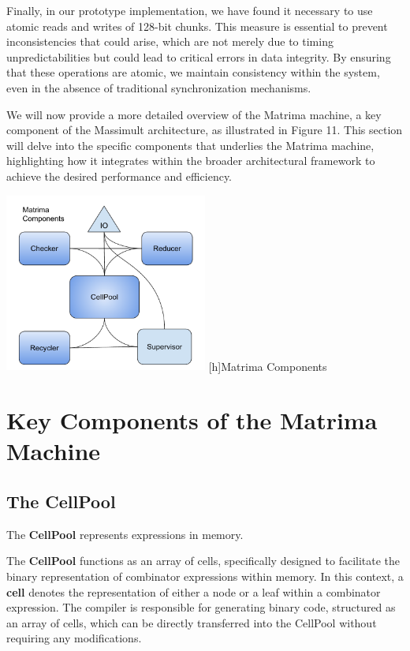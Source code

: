\documentclass{IEEEtran}
\begin{document}
\par Finally, in our prototype implementation, we have found it necessary to use atomic reads and writes of 128-bit chunks. This measure is essential to prevent inconsistencies that could arise, which are not merely due to timing unpredictabilities but could lead to critical errors in data integrity. By ensuring that these operations are atomic, we maintain consistency within the system, even in the absence of traditional synchronization mechanisms.

\par We will now provide a more detailed overview of the Matrima machine, a key component of the Massimult architecture, as illustrated in Figure 11. This section will delve into the specific components that underlies the Matrima machine, highlighting how it integrates within the broader architectural framework to achieve the desired performance and efficiency.

\includegraphics[width=0.5\textwidth]{figs/matrima_components.pdf}
\begingroup\vspace*{-\baselineskip}
[h]{Matrima Components}
\vspace*{\baselineskip}\endgroup

\section{Key Components of the Matrima Machine}

\subsection{The CellPool}
\par The \textbf{CellPool} represents expressions in memory.

\par The \textbf{CellPool} functions as an array of cells, specifically designed to facilitate the binary representation of combinator expressions within memory. In this context, a \textbf{cell} denotes the representation of either a node or a leaf within a combinator expression. The compiler is responsible for generating binary code, structured as an array of cells, which can be directly transferred into the CellPool without requiring any modifications.
\end{document}
